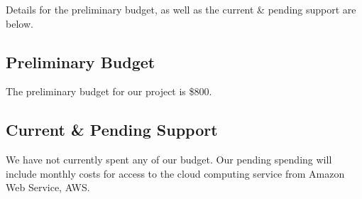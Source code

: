 Details for the preliminary budget, as well as the current \& pending support are below.

\subsection{Preliminary Budget}
The preliminary budget for our project is \$800.

\subsection{Current \& Pending Support}
We have not currently spent any of our budget.
Our pending spending will include monthly costs for access to the cloud computing service from Amazon Web Service, AWS.
